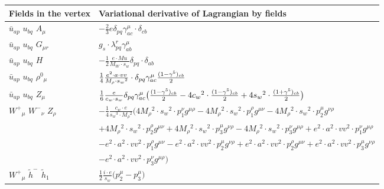 \begin{center}
\begin{tabular}{|l|l|} \hline
Fields in the vertex & Variational derivative of Lagrangian by fields \\ \hline
$\bar{u}{}_{a p }$ \phantom{-} $u{}_{b q }$ \phantom{-} ${A}_{\mu }$ \phantom{-}  &
	$-\frac{2}{3} e\delta_{p q} \gamma_{a c}^\mu \cdot \delta_{c b} $\\[2mm]
$\bar{u}{}_{a p }$ \phantom{-} $u{}_{b q }$ \phantom{-} ${G}_{\mu r }$ \phantom{-}  &
	$ g_s\cdot \lambda_{p q}^r \gamma_{a b}^\mu $\\[2mm]
$\bar{u}{}_{a p }$ \phantom{-} $u{}_{b q }$ \phantom{-} ${H}_{}$ \phantom{-}  &
	$-\frac{1}{2}\frac{ e \cdot Mu}{ M_W \cdot s_w}\delta_{p q} \cdot \delta_{a b} $\\[2mm]
$\bar{u}{}_{a p }$ \phantom{-} $u{}_{b q }$ \phantom{-} $\rho^0{}_{\mu }$ \phantom{-}  &
	$\frac{1}{4}\frac{ e{}^2  \cdot a \cdot vv}{ M_{\rho} \cdot s_w{}^2 }\cdot \delta_{p q} \gamma_{a c}^\mu {(1-\gamma^5)_{c b}\over 2} $\\[2mm]
$\bar{u}{}_{a p }$ \phantom{-} $u{}_{b q }$ \phantom{-} ${Z}_{\mu }$ \phantom{-}  &
	$\frac{1}{6}\frac{ e}{ c_w \cdot s_w}\delta_{p q} \gamma_{a c}^\mu \big({(1-\gamma^5)_{c b}\over 2} -4 c_w{}^2 \cdot {(1-\gamma^5)_{c b}\over 2} +4 s_w{}^2 \cdot {(1+\gamma^5)_{c b}\over 2} \big)$\\[2mm]
$W^+{}_{\mu }$ \phantom{-} $W^-{}_{\nu }$ \phantom{-} ${Z}_{\rho }$ \phantom{-}  &
	$-\frac{1}{4}\frac{ c_w \cdot e}{ s_w{}^3  \cdot M_{\rho}{}^2 }\big(4 M_{\rho}{}^2 \cdot  s_w{}^2 \cdot p_1^\nu g^{\mu \rho} -4 M_{\rho}{}^2 \cdot  s_w{}^2 \cdot p_1^\rho g^{\mu \nu} -4 M_{\rho}{}^2 \cdot  s_w{}^2 \cdot p_2^\mu g^{\nu \rho} $ \\[2mm]
  & $+4 M_{\rho}{}^2 \cdot  s_w{}^2 \cdot p_2^\rho g^{\mu \nu} +4 M_{\rho}{}^2 \cdot  s_w{}^2 \cdot p_3^\mu g^{\nu \rho} -4 M_{\rho}{}^2 \cdot  s_w{}^2 \cdot p_3^\nu g^{\mu \rho} + e{}^2 \cdot  a{}^2 \cdot  vv{}^2 \cdot p_1^\nu g^{\mu \rho} $ \\[2mm]
  & $- e{}^2 \cdot  a{}^2 \cdot  vv{}^2 \cdot p_1^\rho g^{\mu \nu} - e{}^2 \cdot  a{}^2 \cdot  vv{}^2 \cdot p_2^\mu g^{\nu \rho} + e{}^2 \cdot  a{}^2 \cdot  vv{}^2 \cdot p_2^\rho g^{\mu \nu} + e{}^2 \cdot  a{}^2 \cdot  vv{}^2 \cdot p_3^\mu g^{\nu \rho} $ \\[2mm]
  & $- e{}^2 \cdot  a{}^2 \cdot  vv{}^2 \cdot p_3^\nu g^{\mu \rho} \big)$\\[2mm]
$W^+{}_{\mu }$ \phantom{-} $\widetilde{h}^-{}_{}$ \phantom{-} $\widetilde{h}_1{}_{}$ \phantom{-}  &
	$\frac{1}{2}\frac{ i \cdot e}{ s_w}\big(p_2^\mu -p_3^\mu \big)$\\[2mm]

\end{tabular}
\end{center}
